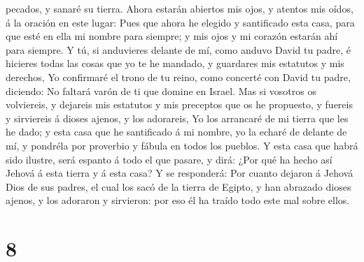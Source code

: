 pecados, y sanaré su tierra.  Ahora estarán abiertos mis
ojos, y atentos mis oídos, á la oración en este lugar: 
Pues que ahora he elegido y santificado esta casa, para que esté en ella
mi nombre para siempre; y mis ojos y mi corazón estarán ahí para
siempre.  Y tú, si anduvieres delante de mí, como anduvo
David tu padre, é hicieres todas las cosas que yo te he mandado, y
guardares mis estatutos y mis derechos,  Yo confirmaré el
trono de tu reino, como concerté con David tu padre, diciendo: No
faltará varón de ti que domine en Israel.  Mas si
vosotros os volviereis, y dejareis mis estatutos y mis preceptos que os
he propuesto, y fuereis y sirviereis á dioses ajenos, y los adorareis,
 Yo los arrancaré de mi tierra que les he dado; y esta
casa que he santificado á mi nombre, yo la echaré de delante de mí, y
pondréla por proverbio y fábula en todos los pueblos.  Y
esta casa que habrá sido ilustre, será espanto á todo el que pasare, y
dirá: ¿Por qué ha hecho así Jehová á esta tierra y á esta casa?
 Y se responderá: Por cuanto dejaron á Jehová Dios de sus
padres, el cual los sacó de la tierra de Egipto, y han abrazado dioses
ajenos, y los adoraron y sirvieron: por eso él ha traído todo este mal
sobre ellos.

\hypertarget{section-7}{%
\section{8}\label{section-7}}

